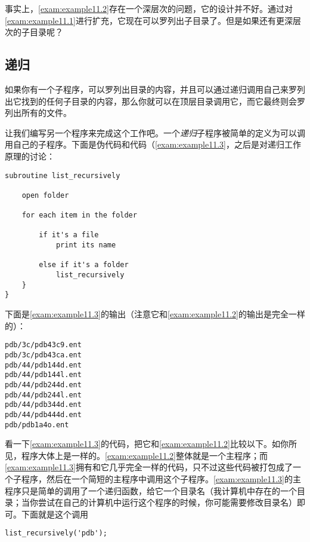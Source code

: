 事实上，\autoref{exam:example11.2}存在一个深层次的问题，它的设计并不好。通过对\autoref{exam:example11.1}进行扩充，它现在可以罗列出子目录了。但是如果还有更深层次的子目录呢？

\subsection{递归}
如果你有一个子程序，可以罗列出目录的内容，并且可以通过递归调用自己来罗列出它找到的任何子目录的内容，那么你就可以在顶层目录调用它，而它最终则会罗列出所有的文件。

让我们编写另一个程序来完成这个工作吧。一个\textit{递归}子程序被简单的定义为可以调用自己的子程序。下面是伪代码和代码（\autoref{exam:example11.3}，之后是对递归工作原理的讨论：

\begin{lstlisting}
subroutine list_recursively

    open folder

    for each item in the folder

        if it's a file
            print its name

        else if it's a folder
            list_recursively
    }
}
\end{lstlisting}



下面是\autoref{exam:example11.3}的输出（注意它和\autoref{exam:example11.2}的输出是完全一样的）：

\begin{lstlisting}
pdb/3c/pdb43c9.ent
pdb/3c/pdb43ca.ent
pdb/44/pdb144d.ent
pdb/44/pdb144l.ent
pdb/44/pdb244d.ent
pdb/44/pdb244l.ent
pdb/44/pdb344d.ent
pdb/44/pdb444d.ent
pdb/pdb1a4o.ent
\end{lstlisting}

看一下\autoref{exam:example11.3}的代码，把它和\autoref{exam:example11.2}比较以下。如你所见，程序大体上是一样的。\autoref{exam:example11.2}整体就是一个主程序；而\autoref{exam:example11.3}拥有和它几乎完全一样的代码，只不过这些代码被打包成了一个子程序，然后在一个简短的主程序中调用这个子程序。\autoref{exam:example11.3}的主程序只是简单的调用了一个递归函数，给它一个目录名（我计算机中存在的一个目录；当你尝试在自己的计算机中运行这个程序的时候，你可能需要修改目录名）即可。下面就是这个调用

\begin{lstlisting}
list_recursively('pdb');
\end{lstlisting}

